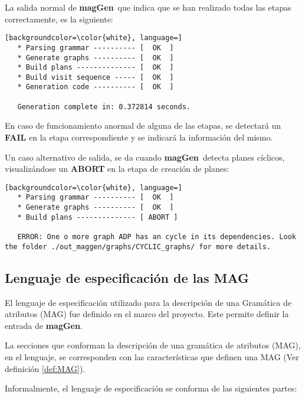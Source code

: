 \documentclass[runningheads,a4paper]{llncs}
\newcommand{\maggen}{\textbf{magGen}}
\begin{document}
La salida normal de \maggen\ que indica que se han realizado todas las etapas correctamente, es la siguiente:
{\scriptsize
\vspace{0.3cm}
\begin{lstlisting}[backgroundcolor=\color{white}, language=]
   * Parsing grammar ---------- [  OK  ]
   * Generate graphs ---------- [  OK  ]
   * Build plans -------------- [  OK  ]
   * Build visit sequence ----- [  OK  ]
   * Generation code ---------- [  OK  ]

   Generation complete in: 0.372814 seconds.
\end{lstlisting}
\vspace{0.3cm}}

En caso de funcionamiento anormal de alguna de las etapas, se detectará un \textbf{FAIL} en la etapa correspondiente y se indicará la información del mismo.

Un caso alternativo de salida, se da cuando \maggen\ detecta planes cíclicos, visualizándose un \textbf{ABORT} en la etapa de creación de planes:
{\scriptsize
\vspace{0.3cm}
\begin{lstlisting}[backgroundcolor=\color{white}, language=] 
   * Parsing grammar ---------- [  OK  ]
   * Generate graphs ---------- [  OK  ]
   * Build plans -------------- [ ABORT ]

   ERROR: One o more graph ADP has an cycle in its dependencies. Look the folder ./out_maggen/graphs/CYCLIC_graphs/ for more details.
\end{lstlisting}
\vspace{0.3cm}}

\subsection{Lenguaje de especificación de las MAG}
\label{sec:lenguajeMAG}

El lenguaje de especificación utilizado para la descripción de una Gramática de atributos (MAG) fue definido en el marco del proyecto. Este permite definir la entrada de \maggen.
 
La secciones que conforman la descripción de una gramática de atributos (MAG), en el lenguaje, se corresponden con las características que definen una MAG (Ver definición \ref{def:MAG}).
 
Informalmente, el lenguaje de especificación se conforma de las siguientes partes:
\end{document}
